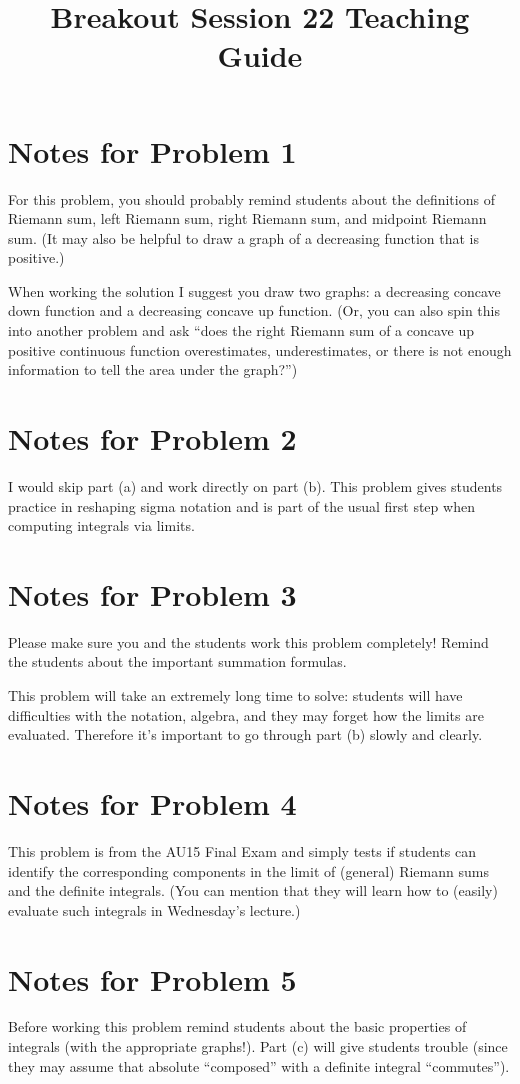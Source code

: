 \documentclass[handout,nooutcomes]{ximera}
\title{Breakout Session 22 Teaching Guide}
\begin{document}
\begin{abstract}

\end{abstract}
\maketitle

\section{Notes for Problem 1}
For this problem, you should probably remind students about the definitions of Riemann sum, left Riemann sum, right Riemann sum, and midpoint Riemann sum.
(It may also be helpful to draw a graph of a decreasing function that is positive.)

When working the solution I suggest you draw two graphs: a decreasing concave down function and a decreasing concave up function.
(Or, you can also spin this into another problem and ask ``does the right Riemann sum of a concave up positive continuous function overestimates, underestimates, or there is not enough information to tell the area under the graph?'')

\section{Notes for Problem 2}
I would skip part (a) and work directly on part (b).
This problem gives students practice in reshaping sigma notation and is part of the usual first step when computing integrals via limits.

\section{Notes for Problem 3}
Please make sure you and the students work this problem completely!
Remind the students about the important summation formulas.

This problem will take an extremely long time to solve: students will have difficulties with the notation, algebra, and they may forget how the limits are evaluated.
Therefore it’s important to go through part (b) slowly and clearly.

\section{Notes for Problem 4}
This problem is from the AU15 Final Exam and simply tests if students can identify the corresponding components in the limit of (general) Riemann sums and the definite integrals.
(You can mention that they will learn how to (easily) evaluate such integrals in Wednesday's lecture.)

\section{Notes for Problem 5}
Before working this problem remind students about the basic properties of integrals (with the appropriate graphs!).
Part (c) will give students trouble (since they may assume that absolute ``composed'' with a definite integral ``commutes'').
\end{document}
